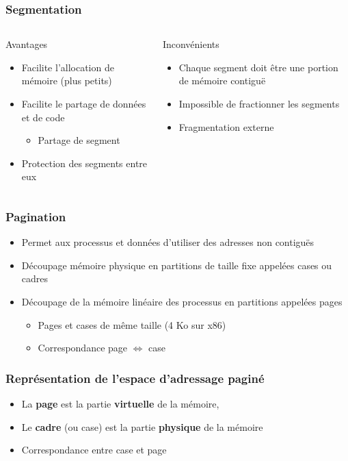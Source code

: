 \begin{frame}
\frametitle{Segmentation}
\begin{columns}
\begin{block}{Avantages}
\begin{itemize}
\item Facilite l'allocation de mémoire (plus petits)
\item Facilite le partage de données et de code
\begin{itemize}
\item Partage de segment
\end{itemize}
\item Protection des segments entre eux
\end{itemize}
\end{block}
\begin{block}{Inconvénients}
\begin{itemize}
\item Chaque segment doit être une portion de mémoire contiguë
\item Impossible de fractionner les segments
\item Fragmentation externe
\end{itemize}
\end{block}
\end{columns}
\end{frame}



\begin{frame}
\frametitle{Pagination}
\begin{itemize}
\item Permet aux processus et données d'utiliser des adresses non contiguës
\item Découpage mémoire physique en partitions de taille fixe appelées cases ou cadres
\item Découpage de la mémoire linéaire des processus en partitions appelées pages
\begin{itemize}
\item Pages et cases de même taille (4 Ko sur x86)
\item Correspondance page $\Leftrightarrow$ case
\end{itemize}
\end{itemize}
\end{frame}


\begin{frame}
\frametitle{Représentation de l'espace d'adressage paginé}
\begin{itemize}
\item La \textbf{page} est la partie \textbf{virtuelle} de la mémoire,
\item Le \textbf{cadre} (ou case) est la partie \textbf{physique} de la mémoire
\item Correspondance entre case et page
\end{itemize}
\end{frame}

